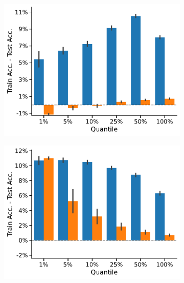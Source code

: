 \begin{figure}[!b]
\begin{subfigure}[b]{0.3\textwidth}
		\vspace*{-4ex} 
		\caption{\imdb}
	\end{subfigure}
	\hfill
	\begin{subfigure}[b]{0.3\textwidth}
		\centering
		\includegraphics[width=\textwidth]{Figures/train_test_diff_MUTAG.pdf}
		\vspace*{-4ex} 
		\caption{\mutag}
	\end{subfigure}
	\par\bigskip
	\begin{subfigure}[b]{0.3\textwidth}
		\centering
		\includegraphics[width=\textwidth]{Figures/train_test_diff_NCI1.pdf}
		\vspace*{-4ex} 
		\caption{\nci}
	\end{subfigure}

\end{figure}

